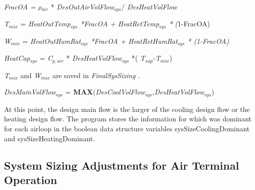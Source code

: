 \emph{FracOA = $\rho$\(_{air}\)} * \emph{DesOutAirVolFlow\(_{sys}\)}/ \emph{DesHeatVolFlow}

\emph{T\(_{mix}\)} = \emph{HeatOutTemp\(_{sys}\) *FracOA + HeatRetTemp\(_{sys}\) *} \emph{(}1-FracOA)

\emph{W\(_{mix}\)} = \emph{HeatOutHumRat\(_{sys}\) *FracOA + HeatRetHumRat\(_{sys}\) * (1-FracOA)}

\emph{HeatCap\(_{sys}\)} = \emph{C\(_{p,air}\)} * \emph{DesHeatVolFlow\(_{sys}\)} *( \emph{T\(_{sup}\)}-\emph{T\(_{mix}\)})

\emph{T\(_{mix}\)} and \emph{W\(_{mix}\)} are saved in \emph{FinalSysSizing} \emph{.}

\begin{enumerate}
\def\labelenumi{(\roman{enumi})}
\setcounter{enumi}{6}
\tightlist
{\setlength\itemindent{25pt} \item \emph{DesMainVolFlow\(_{sys}\)} = \textbf{MAX}(\emph{DesCoolVolFlow\(_{sys}\)},\emph{DesHeatVolFlow\(_{sys}\)})}
\end{enumerate}

At this point, the design main flow is the larger of the cooling design flow or the heating design flow. The program stores the information for which was dominant for each airloop in the boolean data structure variables sysSizeCoolingDominant and sysSizeHeatingDominant. 

\subsection{System Sizing Adjustments for Air Terminal Operation}\label{system-sizing-adjustments-for-air-terminal-operation}

